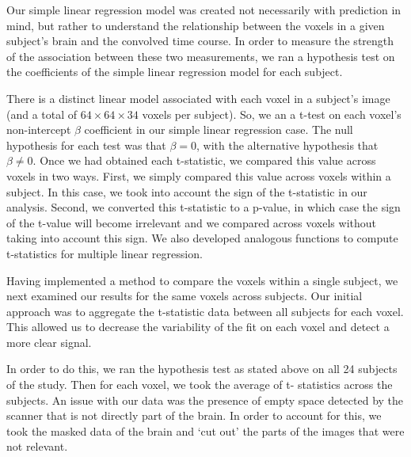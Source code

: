 \par \indent Our simple linear regression model was created not necessarily 
with prediction in mind, but rather to understand the relationship between 
the voxels in a given subject's brain and the convolved time course. In order 
to measure the strength of the association between these two measurements, we 
ran a hypothesis test on the coefficients of the simple linear regression 
model for each subject.

\par There is a distinct linear model associated with each voxel in a 
subject’s image (and a total of $64 \times 64 \times 34$ voxels per subject). 
So, we an a t-test on each voxel's non-intercept $\beta$ coefficient in our 
simple linear regression case. The null hypothesis for each test was that $
\beta = 0$, with the alternative hypothesis that $\beta \neq 0$. Once we had 
obtained each t-statistic, we compared this value across voxels in two ways. 
First, we simply compared this value across voxels within a subject. In this 
case, we took into account the sign of the t-statistic in our analysis. 
Second, we converted this t-statistic to a p-value, in which case the sign of 
the t-value will become irrelevant and we compared across voxels without 
taking into account this sign.  We also developed analogous functions to 
compute t-statistics for multiple linear regression. 

\par Having implemented a  method to compare the voxels within a single 
subject, we next examined our results for the same voxels across subjects. 
Our initial approach was to aggregate the t-statistic data between all 
subjects for each voxel. This allowed us to decrease the variability of the 
fit on each voxel and detect a more clear signal. 

\par In order to do this, we ran the hypothesis test as stated above on all 
24 subjects of the study. Then for each voxel, we took the average of t-
statistics across the subjects. An issue with our data was the presence of 
empty space detected by the scanner that is not directly part of the brain. 
In order to account for this, we took the masked data of the brain and ‘cut 
out’ the parts of the images that were not relevant. 
